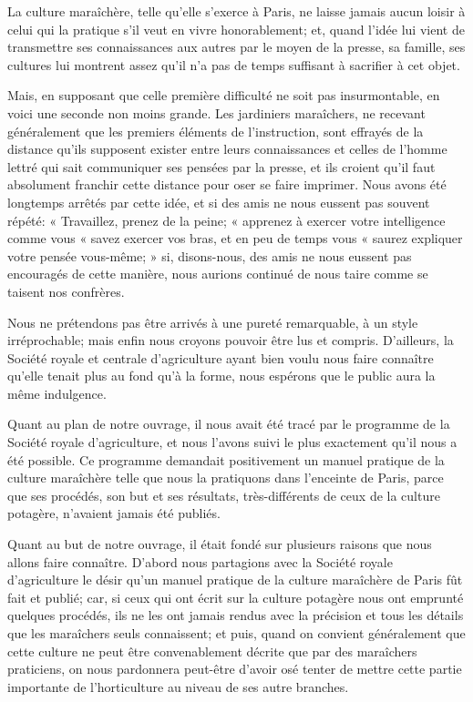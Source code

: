 \documentclass[10pt,a4paper]{book}
\begin{document}
La culture maraîchère, telle qu'elle s'exerce à Paris, ne laisse jamais aucun loisir à celui qui la pratique s'il veut en vivre honorablement; et, quand l'idée lui vient de transmettre ses connaissances aux autres par le moyen de la presse, sa famille, ses cultures lui montrent assez qu'il n'a pas de temps suffisant à sacrifier à cet objet.

Mais, en supposant que celle première difficulté ne soit pas insurmontable, en voici une seconde non moins grande. Les jardiniers maraîchers, ne recevant généralement que les premiers éléments de l'instruction, sont effrayés de la distance qu'ils supposent exister entre leurs connaissances et celles de l'homme lettré qui sait communiquer ses pensées par la presse, et ils croient qu'il faut absolument franchir cette distance pour oser se faire imprimer. Nous avons été longtemps arrêtés par cette idée, et si des amis ne nous eussent pas souvent répété: « Travaillez, prenez de la peine; « apprenez à exercer votre intelligence comme vous « savez exercer vos bras, et en peu de temps vous « saurez expliquer votre pensée vous-même; » si, disons-nous, des amis ne nous eussent pas encouragés de cette manière, nous aurions continué de nous taire comme se taisent nos confrères.

Nous ne prétendons pas être arrivés à une pureté remarquable, à un style irréprochable; mais enfin nous croyons pouvoir être lus et compris. D'ailleurs, la Société royale et centrale d'agriculture ayant bien voulu nous faire connaître qu'elle tenait plus au fond qu'à la forme, nous espérons que le public aura la même indulgence.

Quant au plan de notre ouvrage, il nous avait été tracé par le programme de la Société royale d'agriculture, et nous l'avons suivi le plus exactement qu'il nous a été possible. Ce programme demandait positivement un manuel pratique de la culture maraîchère telle que nous la pratiquons dans l'enceinte de Paris, parce que ses procédés, son but et ses résultats, très-différents de ceux de la culture potagère, n'avaient jamais été publiés.

Quant au but de notre ouvrage, il était fondé sur plusieurs raisons que nous allons faire connaître. D'abord nous partagions avec la Société royale d'agriculture le désir qu'un manuel pratique de la culture maraîchère de Paris fût fait et publié; car, si ceux qui ont écrit sur la culture potagère nous ont emprunté quelques procédés, ils ne les ont jamais rendus avec la précision et tous les détails que les maraîchers seuls connaissent; et puis, quand on convient généralement que cette culture ne peut être convenablement décrite que par des maraîchers praticiens, on nous pardonnera peut-être d'avoir osé tenter de mettre cette partie importante de l'horticulture au niveau de ses autre branches.
\end{document}
